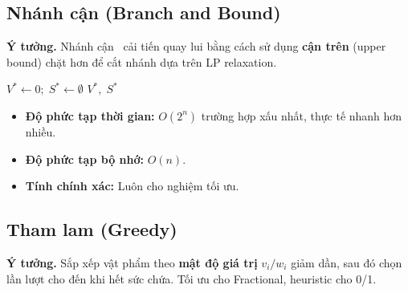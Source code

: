 \subsection{Nhánh cận (Branch and Bound)}

\textbf{Ý tưởng.} Nhánh cận~\cite{land1960automatic} cải tiến quay lui bằng cách sử dụng \textbf{cận trên} (upper bound) chặt hơn để cắt nhánh dựa trên LP relaxation.

\begin{algorithm}[H]
\caption{Nhánh cận cho 0/1 Knapsack}
\label{alg:bnb}
$V^* \leftarrow 0;\; S^* \leftarrow \emptyset$\;
\;
\Return $V^*,\; S^*$\;
\end{algorithm}

\begin{itemize}[noitemsep]
    \item \textbf{Độ phức tạp thời gian:} $O(2^n)$ trường hợp xấu nhất, thực tế nhanh hơn nhiều.
    \item \textbf{Độ phức tạp bộ nhớ:} $O(n)$.
    \item \textbf{Tính chính xác:} Luôn cho nghiệm tối ưu.
\end{itemize}

\subsection{Tham lam (Greedy)}

\textbf{Ý tưởng.} Sắp xếp vật phẩm theo \textbf{mật độ giá trị} $v_i / w_i$ giảm dần, sau đó chọn lần lượt cho đến khi hết sức chứa. Tối ưu cho Fractional, heuristic cho 0/1.

